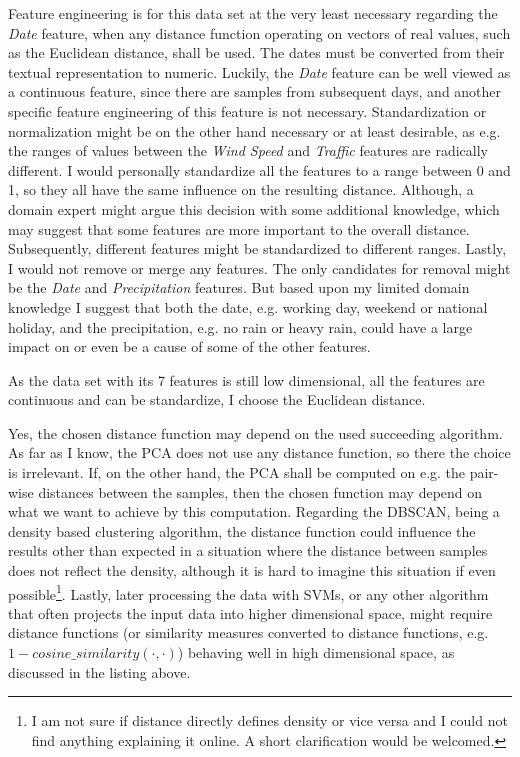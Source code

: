 \documentclass[a4paper,10pt]{article}\setlength{\textheight}{10in}\setlength{\textwidth}{6.5in}\setlength{\topmargin}{-0.125in}\setlength{\oddsidemargin}{-.2in}\setlength{\evensidemargin}{-.2in}\setlength{\headsep}{0.2in}\setlength{\footskip}{0pt}\usepackage{amsmath}\usepackage{fancyhdr}\usepackage{enumitem}\usepackage{hyperref}\usepackage{xcolor}\usepackage{graphicx}\pagestyle{fancy}
\begin{document}
\begin{enumerate}[topsep=0mm, partopsep=0mm, leftmargin=*]
Feature engineering is for this data set at the very least necessary regarding the \textit{Date} feature, when any distance function operating on vectors of real values, such as the Euclidean distance, shall be used. The dates must be converted from their textual representation to numeric. Luckily, the \textit{Date} feature can be well viewed as a continuous feature, since there are samples from subsequent days, and another specific feature engineering of this feature is not necessary. Standardization or normalization might be on the other hand necessary or at least desirable, as e.g. the ranges of values between the \textit{Wind Speed} and \textit{Traffic} features are radically different. I would personally standardize all the features to a range between 0 and 1, so they all have the same influence on the resulting distance. Although, a domain expert might argue this decision with some additional knowledge, which may suggest that some features are more important to the overall distance. Subsequently, different features might be standardized to different ranges. Lastly, I would not remove or merge any features. The only candidates for removal might be the \textit{Date} and \textit{Precipitation} features. But based upon my limited domain knowledge I suggest that both the date, e.g. working day, weekend or national holiday, and the precipitation, e.g. no rain or heavy rain, could have a large impact on or even be a cause of some of the other features.

As the data set with its 7 features is still low dimensional, all the features are continuous and can be standardize, I choose the Euclidean distance.

Yes, the chosen distance function may depend on the used succeeding algorithm. As far as I know, the PCA does not use any distance function, so there the choice is irrelevant. If, on the other hand, the PCA shall be computed on e.g. the pair-wise distances between the samples, then the chosen function may depend on what we want to achieve by this computation. Regarding the DBSCAN, being a density based clustering algorithm, the distance function could influence the results other than expected in a situation where the distance between samples does not reflect the density, although it is hard to imagine this situation if even possible\footnote{I am not sure if distance directly defines density or vice versa and I could not find anything explaining it online. A short clarification would be welcomed.}. Lastly, later processing the data with SVMs, or any other algorithm that often projects the input data into higher dimensional space, might require distance functions (or similarity measures converted to distance functions, e.g. $1 - cosine\_similarity(\cdot, \cdot)$) behaving well in high dimensional space, as discussed in the listing above.    


\end{enumerate}
\end{document}
